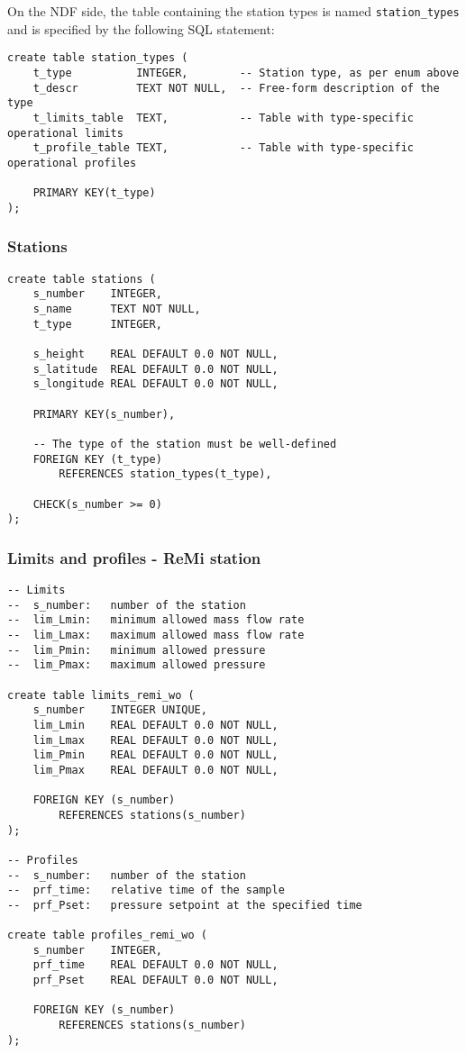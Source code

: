 \documentclass[10pt]{article}
\begin{document}
On the NDF side, the table containing the station types is named
\texttt{station\_types} and is specified by the following SQL statement:
\begin{verbatim}
create table station_types (
    t_type          INTEGER,        -- Station type, as per enum above
    t_descr         TEXT NOT NULL,  -- Free-form description of the type
    t_limits_table  TEXT,           -- Table with type-specific operational limits
    t_profile_table TEXT,           -- Table with type-specific operational profiles

    PRIMARY KEY(t_type)
);
\end{verbatim}

\begin{itemize}
    
\end{itemize}

\subsubsection{Stations}

\begin{verbatim}
create table stations (
    s_number    INTEGER,
    s_name      TEXT NOT NULL,
    t_type      INTEGER,

    s_height    REAL DEFAULT 0.0 NOT NULL,
    s_latitude  REAL DEFAULT 0.0 NOT NULL,
    s_longitude REAL DEFAULT 0.0 NOT NULL,

    PRIMARY KEY(s_number),
    
    -- The type of the station must be well-defined
    FOREIGN KEY (t_type)
        REFERENCES station_types(t_type),
    
    CHECK(s_number >= 0)
);
\end{verbatim}

\subsubsection{Limits and profiles - ReMi station}

\begin{verbatim}
-- Limits
--  s_number:   number of the station
--  lim_Lmin:   minimum allowed mass flow rate
--  lim_Lmax:   maximum allowed mass flow rate
--  lim_Pmin:   minimum allowed pressure
--  lim_Pmax:   maximum allowed pressure

create table limits_remi_wo (
    s_number    INTEGER UNIQUE,
    lim_Lmin    REAL DEFAULT 0.0 NOT NULL,
    lim_Lmax    REAL DEFAULT 0.0 NOT NULL,
    lim_Pmin    REAL DEFAULT 0.0 NOT NULL,
    lim_Pmax    REAL DEFAULT 0.0 NOT NULL,

    FOREIGN KEY (s_number)
        REFERENCES stations(s_number)
);

-- Profiles
--  s_number:   number of the station
--  prf_time:   relative time of the sample
--  prf_Pset:   pressure setpoint at the specified time

create table profiles_remi_wo (
    s_number    INTEGER,
    prf_time    REAL DEFAULT 0.0 NOT NULL,
    prf_Pset    REAL DEFAULT 0.0 NOT NULL,

    FOREIGN KEY (s_number)
        REFERENCES stations(s_number)
);
\end{verbatim}
\end{document}
